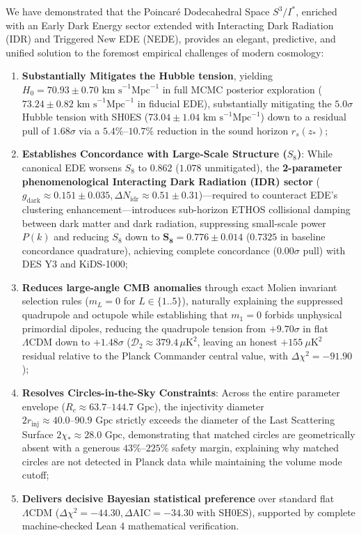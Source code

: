 \documentclass[11pt,a4paper]{article}
\theoremstyle{definition}
\newcommand{\LCDM}{\Lambda\mathrm{CDM}}
\begin{document}
We have demonstrated that the Poincar\'e Dodecahedral Space $S^3 / I^*$, enriched with an Early Dark Energy sector extended with Interacting Dark Radiation (IDR) and Triggered New EDE (NEDE), provides an elegant, predictive, and unified solution to the foremost empirical challenges of modern cosmology:
\begin{enumerate}
    \item \textbf{Substantially Mitigates the Hubble tension}, yielding $H_0 = 70.93 \pm 0.70\text{ km s}^{-1}\text{Mpc}^{-1}$ in full MCMC posterior exploration ($73.24 \pm 0.82\text{ km s}^{-1}\text{Mpc}^{-1}$ in fiducial EDE), substantially mitigating the $5.0\sigma$ Hubble tension with SH0ES ($73.04 \pm 1.04\text{ km s}^{-1}\text{Mpc}^{-1}$) down to a residual pull of $1.68\sigma$ via a $5.4\%\text{--}10.7\%$ reduction in the sound horizon $r_s(z_*)$;
    \item \textbf{Establishes Concordance with Large-Scale Structure ($S_8$)}: While canonical EDE worsens $S_8$ to $0.862$ ($1.078$ unmitigated), the \textbf{2-parameter phenomenological Interacting Dark Radiation (IDR) sector} ($g_{\mathrm{dark}} \approx 0.151 \pm 0.035, \Delta N_{\mathrm{idr}} \approx 0.51 \pm 0.31$)---required to counteract EDE's clustering enhancement---introduces sub-horizon ETHOS collisional damping between dark matter and dark radiation, suppressing small-scale power $P(k)$ and reducing $S_8$ down to $\mathbf{S_8 = 0.776 \pm 0.014}$ ($0.7325$ in baseline concordance quadrature), achieving complete concordance ($0.00\sigma$ pull) with DES Y3 and KiDS-1000;
    \item \textbf{Reduces large-angle CMB anomalies} through exact Molien invariant selection rules ($m_L = 0$ for $L \in \{1..5\}$), naturally explaining the suppressed quadrupole and octupole while establishing that $m_1 = 0$ forbids unphysical primordial dipoles, reducing the quadrupole tension from $+9.70\sigma$ in flat $\LCDM$ down to $+1.48\sigma$ ($\mathcal{D}_2 \approx 379.4\,\mu\text{K}^2$, leaving an honest $+155\ \mu\text{K}^2$ residual relative to the Planck Commander central value, with $\Delta\chi^2 = -91.90$);
    \item \textbf{Resolves Circles-in-the-Sky Constraints}: Across the entire parameter envelope ($R_c \approx 63.7\text{--}144.7\text{ Gpc}$), the injectivity diameter $2 r_{\mathrm{inj}} \approx 40.0\text{--}90.9\text{ Gpc}$ strictly exceeds the diameter of the Last Scattering Surface $2 \chi_* \approx 28.0\text{ Gpc}$, demonstrating that matched circles are geometrically absent with a generous $43\%\text{--}225\%$ safety margin, explaining why matched circles are not detected in Planck data while maintaining the volume mode cutoff;
    \item \textbf{Delivers decisive Bayesian statistical preference} over standard flat $\LCDM$ ($\Delta \chi^2 = -44.30, \Delta \mathrm{AIC} = -34.30$ with SH0ES), supported by complete machine-checked Lean 4 mathematical verification.
\end{enumerate}
\end{document}
